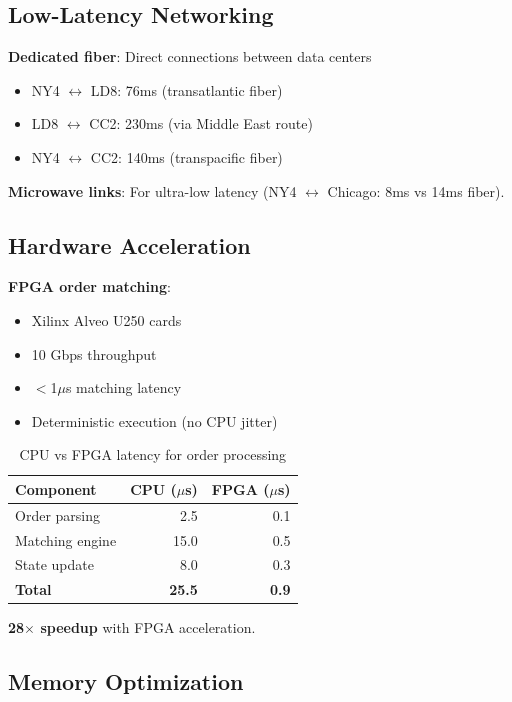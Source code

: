 \documentclass[11pt,letterpaper]{article}
\begin{document}
\subsection{Low-Latency Networking}

\textbf{Dedicated fiber}: Direct connections between data centers
\begin{itemize}
    \item NY4 $\leftrightarrow$ LD8: 76ms (transatlantic fiber)
    \item LD8 $\leftrightarrow$ CC2: 230ms (via Middle East route)
    \item NY4 $\leftrightarrow$ CC2: 140ms (transpacific fiber)
\end{itemize}

\textbf{Microwave links}: For ultra-low latency (NY4 $\leftrightarrow$ Chicago: 8ms vs 14ms fiber).

\subsection{Hardware Acceleration}

\textbf{FPGA order matching}:
\begin{itemize}
    \item Xilinx Alveo U250 cards
    \item 10 Gbps throughput
    \item $<$1$\mu$s matching latency
    \item Deterministic execution (no CPU jitter)
\end{itemize}

\begin{table}[h]
\centering
\begin{tabular}{lrr}
\toprule
\textbf{Component} & \textbf{CPU ($\mu$s)} & \textbf{FPGA ($\mu$s)} \\
\midrule
Order parsing & 2.5 & 0.1 \\
Matching engine & 15.0 & 0.5 \\
State update & 8.0 & 0.3 \\
\textbf{Total} & \textbf{25.5} & \textbf{0.9} \\
\bottomrule
\end{tabular}
\caption{CPU vs FPGA latency for order processing}
\end{table}

\textbf{28$\times$ speedup} with FPGA acceleration.

\subsection{Memory Optimization}
\end{document}
